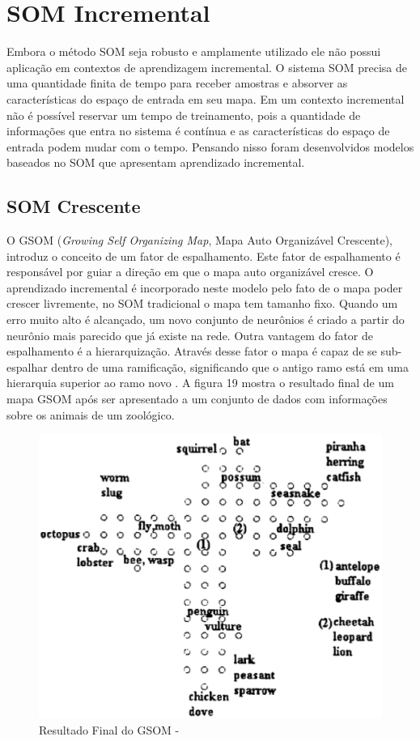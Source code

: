\section{SOM Incremental}
Embora o método SOM seja robusto e amplamente utilizado ele não possui aplicação em contextos de aprendizagem incremental. O sistema SOM precisa de uma quantidade finita de tempo para receber amostras e absorver as características do espaço de entrada em seu mapa. Em um contexto incremental não é possível reservar um tempo de treinamento, pois a quantidade de informações que entra no sistema é contínua e as características do espaço de entrada podem mudar com o tempo. Pensando nisso foram desenvolvidos modelos baseados no SOM que apresentam aprendizado incremental.

\subsection{SOM Crescente}
O GSOM (\textit{Growing Self Organizing Map}, Mapa Auto Organizável Crescente), introduz o conceito de um fator de espalhamento. Este fator de espalhamento é responsável por guiar a direção em que o mapa auto organizável cresce. O aprendizado incremental é incorporado neste modelo pelo fato de o mapa poder crescer livremente, no SOM tradicional o mapa tem tamanho fixo. Quando um erro muito alto é alcançado, um novo conjunto de neurônios é criado a partir do neurônio mais parecido que já existe na rede. Outra vantagem do fator de espalhamento é a hierarquização. Através desse fator o mapa é capaz de se sub-espalhar dentro de uma ramificação, significando que o antigo ramo está em uma hierarquia superior ao ramo novo \cite{gsom2000}. A figura 19 mostra o resultado final de um mapa GSOM após ser apresentado a um conjunto de dados com informações sobre os animais de um zoológico.

\begin{figure}[!h]
\centering
\includegraphics[keepaspectratio=true,scale=0.50]
{figuras/gsom.eps}
\caption{Resultado Final do GSOM - }
\label{data_titatic}
\end{figure}

